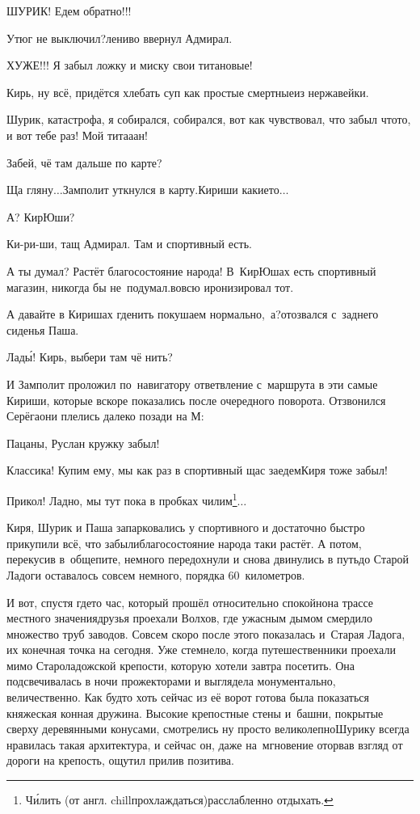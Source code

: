 \diagdash ШУРИК! Едем обратно!!!

\diagdash Утюг не выключил?\mdash лениво ввернул Адмирал.

\diagdash ХУЖЕ!!! Я забыл ложку и миску свои титановые!

\diagdash Кирь, ну всё, придётся хлебать суп как простые смертные\mdash из нержавейки.

\diagdash Шурик, катастрофа, я собирался, собирался, вот как чувствовал, что забыл что\sdash то, и вот тебе раз! Мой тита\sdash а\sdash ан!

\diagdash Забей, чё там дальше по карте?

\diagdash Ща гляну$\ldots$\mdash Замполит уткнулся в карту.\mdash Кириши какие\sdash то$\ldots$

\diagdash А? КирЮши?

\diagdash Ки-ри-ши, тащ Адмирал. Там и спортивный есть.

\diagdash А ты думал? Растёт благосостояние народа! В~КирЮшах есть спортивный магазин, никогда бы не~подумал.\mdash вовсю иронизировал тот.

\diagdash А давайте в Киришах где\sdash нить покушаем нормально,~а?\mdash отозвался с~заднего сиденья Паша.

\diagdash Лад\'{ы}! Кирь, выбери там чё нить?

И Замполит проложил по~навигатору ответвление с~маршрута в эти самые Кириши, которые вскоре показались после очередного поворота. Отзвонился Серёга\mdash они плелись далеко позади на М:

\diagdash Пацаны, Руслан кружку забыл!

\diagdash Классика! Купим ему, мы как раз в спортивный щас заедем\mdash Киря тоже забыл!

\renewcommand*{\thefootnote}{\fnsymbol{footnote}}
\setcounter{footnote}{0}
\diagdash Прикол! Ладно, мы тут пока в пробках чилим\footnote{Ч\'{и}лить (от англ. chill\mdash прохлаждаться)\mdash расслабленно отдыхать.}$\ldots$

Киря, Шурик и Паша запарковались у спортивного и достаточно быстро прикупили всё, что забыли\mdash благосостояние народа таки растёт. А потом, перекусив в~общепите, немного передохнули и снова двинулись в путь\mdash до Старой Ладоги оставалось совсем немного, порядка 60~километров.

И вот, спустя где\sdash то час, который прошёл относительно спокойно\mdash на трассе местного значения\mdash друзья проехали Волхов, где ужасным дымом смердило множество труб заводов. Совсем скоро после этого показалась и~Старая Ладога, их конечная точка на сегодня. Уже стемнело, когда путешественники проехали мимо Староладожской крепости, которую хотели завтра посетить. Она подсвечивалась в ночи прожекторами и выглядела монументально, величественно. Как будто хоть сейчас из её ворот готова была показаться княжеская конная дружина. Высокие крепостные стены и~башни, покрытые сверху деревянными конусами, смотрелись ну просто великолепно\mdash Шурику всегда нравилась такая архитектура, и сейчас он, даже на~мгновение оторвав взгляд от дороги на крепость, ощутил прилив позитива. 


